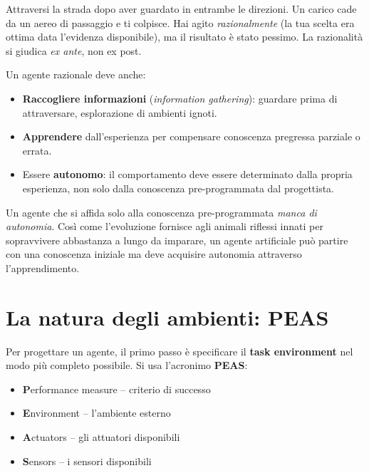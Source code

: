 \begin{exbox}
Attraversi la strada dopo aver guardato in entrambe le direzioni. Un carico cade da un aereo di passaggio e ti colpisce. Hai agito \emph{razionalmente} (la tua scelta era ottima data l'evidenza disponibile), ma il risultato è stato pessimo. La razionalit\`a si giudica \emph{ex ante}, non ex post.
\end{exbox}

Un agente razionale deve anche:
\begin{itemize}
    \item \textbf{Raccogliere informazioni} (\emph{information gathering}): guardare prima di attraversare, esplorazione di ambienti ignoti.
    \item \textbf{Apprendere} dall'esperienza per compensare conoscenza pregressa parziale o errata.
    \item Essere \textbf{autonomo}: il comportamento deve essere determinato dalla propria esperienza, non solo dalla conoscenza pre-programmata dal progettista.
\end{itemize}

\begin{notebox}[Autonomia]
Un agente che si affida solo alla conoscenza pre-programmata \emph{manca di autonomia}. Così come l'evoluzione fornisce agli animali riflessi innati per sopravvivere abbastanza a lungo da imparare, un agente artificiale può partire con una conoscenza iniziale ma deve acquisire autonomia attraverso l'apprendimento.
\end{notebox}


\section{La natura degli ambienti: PEAS}
\begin{defbox}
Per progettare un agente, il primo passo è specificare il \textbf{task environment} nel modo più completo possibile. Si usa l'acronimo \textbf{PEAS}:
\begin{itemize}
    \item \textbf{P}erformance measure -- criterio di successo
    \item \textbf{E}nvironment -- l'ambiente esterno
    \item \textbf{A}ctuators -- gli attuatori disponibili
    \item \textbf{S}ensors -- i sensori disponibili
\end{itemize}
\end{defbox}

